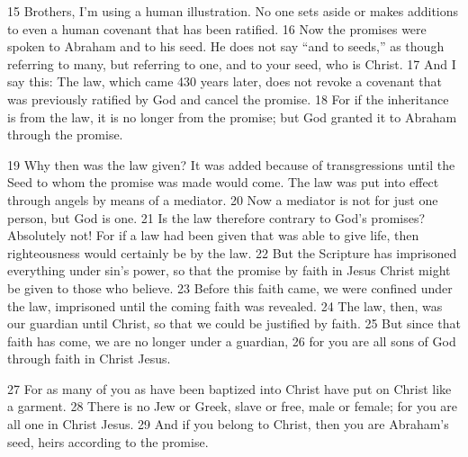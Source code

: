 \begin{bible}
15 Brothers, I'm using a human illustration. No one sets aside or makes additions to even a human covenant that has been ratified.  16 Now the promises were spoken to Abraham and to his seed. He does not say ``and to seeds,'' as though referring to many, but referring to one, and to your seed, who is Christ.  17 And I say this: The law, which came 430 years later, does not revoke a covenant that was previously ratified by God and cancel the promise.  18 For if the inheritance is from the law, it is no longer from the promise; but God granted it to Abraham through the promise.

19 Why then was the law given? It was added because of transgressions until the Seed to whom the promise was made would come. The law was put into effect through angels by means of a mediator.  20 Now a mediator is not for just one person, but God is one.  21 Is the law therefore contrary to God’s promises? Absolutely not! For if a law had been given that was able to give life, then righteousness would certainly be by the law.  22 But the Scripture has imprisoned everything under sin's power, so that the promise by faith in Jesus Christ might be given to those who believe.  23 Before this faith came, we were confined under the law, imprisoned until the coming faith was revealed.  24 The law, then, was our guardian until Christ, so that we could be justified by faith.  25 But since that faith has come, we are no longer under a guardian,  26 for you are all sons of God through faith in Christ Jesus.

27 For as many of you as have been baptized into Christ have put on Christ like a garment.  28 There is no Jew or Greek, slave or free, male or female; for you are all one in Christ Jesus.  29 And if you belong to Christ, then you are Abraham’s seed, heirs according to the promise. 

\end{bible}

